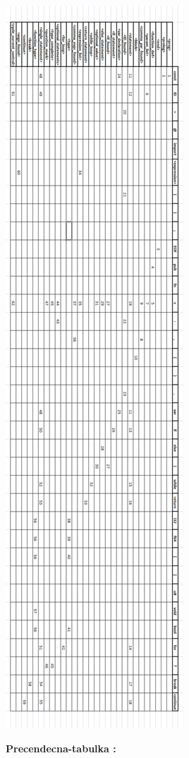 \documentclass[12pt]{article}
\begin{document}
\includegraphics[scale=0.5]{LLtabulka}
\newpage

\Large \textbf{Precendecna-tabulka :}
\newline \\
\end{document}
